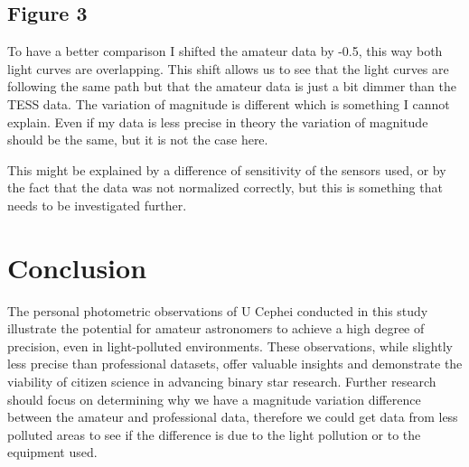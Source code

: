 \documentclass[12pt,a4paper]{article}
\begin{document}
\subsection{Figure 3}

To have a better comparison I shifted the amateur data by -0.5, this way both light curves are overlapping. This shift allows us to see that the light curves are following the same path but that the amateur data is just a bit dimmer than the TESS data.
The variation of magnitude is different which is something I cannot explain. Even if my data is less precise in theory the variation of magnitude should be the same, but it is not the case here.

This might be explained by a difference of sensitivity of the sensors used, or by the fact that the data was not normalized correctly, but this is something that needs to be investigated further.

\section{Conclusion}
The personal photometric observations of U Cephei conducted in this study illustrate the potential for amateur astronomers to achieve a high degree of precision, 
even in light-polluted environments. These observations, while slightly less precise than professional datasets, 
offer valuable insights and demonstrate the viability of citizen science in advancing binary star research. 
Further research should focus on determining why we have a magnitude variation difference between the amateur and professional data,
therefore we could get data from less polluted areas to see if the difference is due to the light pollution or to the equipment used.
\end{document}
